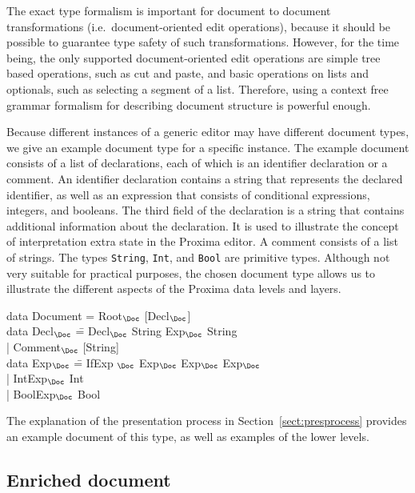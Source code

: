 The exact type formalism is important for document to document transformations (i.e.\ document-oriented edit operations), because it should be possible to guarantee type safety of such transformations. However, for the time being, the only supported document-oriented edit operations are simple tree based operations, such as cut and paste, and basic operations on lists and optionals, such as selecting a segment of a list. Therefore, using a context free grammar formalism for describing document structure is powerful enough.
 
Because different instances of a generic editor may have different document types, we give an example document type for a specific instance. The example document consists of a list of declarations, each of which is an identifier declaration or a comment. An identifier declaration contains a string that represents the declared identifier, as well as an expression that consists of conditional expressions, integers, and booleans. The third field of the declaration is a string that contains additional information about the declaration. It is used to illustrate the concept of interpretation extra state in the Proxima editor. A comment consists of a list of strings. The types {\tt String}, {\tt Int}, and {\tt Bool} are primitive types. Although not very suitable for practical purposes, the chosen document type allows us to illustrate the different aspects of the Proxima data levels and layers.

\noindent
\ttfamily
\begin{tabbing}
data Document = Root$_{\Doc}$ [Decl$_{\Doc}$]\\
data Decl$_{\Doc}$ \= = Decl$_{\Doc}$ String Exp$_{\Doc}$ String\\
                            \> | Comment$_{\Doc}$ [String]\\
data Exp$_{\Doc}$ \= =  IfExp $_{\Doc}$ Exp$_{\Doc}$ Exp$_{\Doc}$ Exp$_{\Doc}$\\
                 \> | IntExp$_{\Doc}$ Int\\
                 \> | BoolExp$_{\Doc}$ Bool\\
\end{tabbing}
\rmfamily

The explanation of the presentation process in Section~\ref{sect:presprocess} provides an example document of this type, as well as examples of the lower levels.

%																
\subsection{Enriched document} \label{sect:enrLevel}

